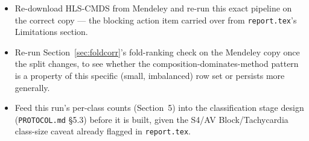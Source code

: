 \documentclass[11pt]{article}
\begin{document}
\begin{itemize}
  \item Re-download HLS-CMDS from Mendeley and re-run this exact pipeline
    on the correct copy --- the blocking action item carried over from
    \texttt{report.tex}'s Limitations section.
  \item Re-run Section~\ref{sec:foldcorr}'s fold-ranking check on the
    Mendeley copy once the split changes, to see whether the
    composition-dominates-method pattern is a property of this specific
    (small, imbalanced) row set or persists more generally.
  \item Feed this run's per-class counts (Section~5) into the classification
    stage design (\texttt{PROTOCOL.md} \S5.3) before it is built, given the
    S4/AV Block/Tachycardia class-size caveat already flagged in
    \texttt{report.tex}.
\end{itemize}
\end{document}
